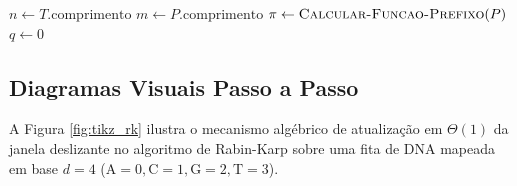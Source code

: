 \documentclass[12pt,a4paper]{article}
\begin{document}
\vspace{0.3cm}

\begin{algorithm}[H]
\DontPrintSemicolon
\SetAlgoLined
{}
$n \leftarrow T.\text{comprimento}$\;
$m \leftarrow P.\text{comprimento}$\;
$\pi \leftarrow \textsc{Calcular-Funcao-Prefixo}(P)$\;
$q \leftarrow 0$ 
\caption{\textsc{Casador-KMP}$(T, P)$}
\label{alg:kmp}
\end{algorithm}

\subsection{Diagramas Visuais Passo a Passo}

A Figura \ref{fig:tikz_rk} ilustra o mecanismo alg\'ebrico de atualiza\c{c}\~ao em $\Theta(1)$ da janela deslizante no algoritmo de Rabin-Karp sobre uma fita de DNA mapeada em base $d=4$ ($\text{A}=0, \text{C}=1, \text{G}=2, \text{T}=3$).
\end{document}
